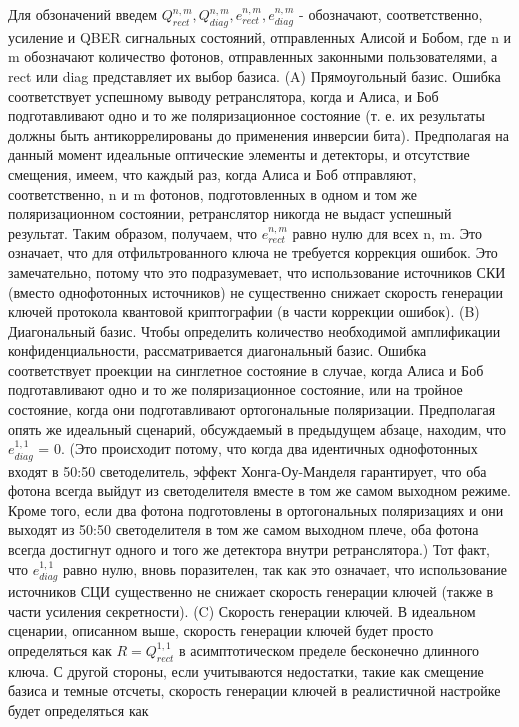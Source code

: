 \newline Для обзоначений введем $Q_{rect}^{n,m} , Q_{diag}^{n,m} , e_{rect}^{n,m} , e_{diag}^{n,m}$ - обозначают, соответственно, усиление и QBER сигнальных состояний, отправленных Алисой и Бобом, где n и m обозначают количество фотонов, отправленных законными пользователями, а rect или diag представляет их выбор базиса.
\newline (A) Прямоугольный базис. Ошибка соответствует успешному выводу ретранслятора, когда и Алиса, и Боб подготавливают одно и то же поляризационное состояние (т. е. их результаты должны быть антикоррелированы до применения инверсии бита). Предполагая на данный момент идеальные оптические элементы и детекторы, и отсутствие смещения, имеем, что каждый раз, когда Алиса и Боб отправляют, соответственно, n и m фотонов, подготовленных в одном и том же поляризационном состоянии, ретранслятор никогда не выдаст успешный результат. Таким образом, получаем, что $e_{rect}^{n,m}$
 равно нулю для всех n, m. Это означает, что для отфильтрованного ключа не требуется коррекция ошибок. Это замечательно, потому что это подразумевает, что использование источников СКИ (вместо однофотонных источников) не существенно снижает скорость генерации ключей протокола квантовой криптографии (в части коррекции ошибок).
\newline (B) Диагональный базис. Чтобы определить количество необходимой амплификации конфиденциальности, рассматривается диагональный базис. Ошибка соответствует проекции на синглетное состояние в случае, когда Алиса и Боб подготавливают одно и то же поляризационное состояние, или на тройное состояние, когда они подготавливают ортогональные поляризации. Предполагая опять же идеальный сценарий, обсуждаемый в предыдущем абзаце, находим, что $e_{diag}^{1,1}$ = 0. (Это происходит потому, что когда два идентичных однофотонных входят в 50:50 светоделитель, эффект Хонга-Оу-Манделя \cite{hong1987} гарантирует, что оба фотона всегда выйдут из светоделителя вместе в том же самом выходном режиме. Кроме того, если два фотона подготовлены в ортогональных поляризациях и они выходят из 50:50 светоделителя в том же самом выходном плече, оба фотона всегда достигнут одного и того же детектора внутри ретранслятора.) Тот факт, что $e_{diag}^{1,1}$ равно нулю, вновь поразителен, так как это означает, что использование источников СЦИ существенно не снижает скорость генерации ключей (также в части усиления секретности).
\newline (C) Скорость генерации ключей. В идеальном сценарии, описанном выше, скорость генерации ключей будет просто определяться как $R = Q_{rect}^{1,1}$ в асимптотическом пределе бесконечно длинного ключа. С другой стороны, если учитываются недостатки, такие как смещение базиса и темные отсчеты, скорость генерации ключей в реалистичной настройке будет определяться как
